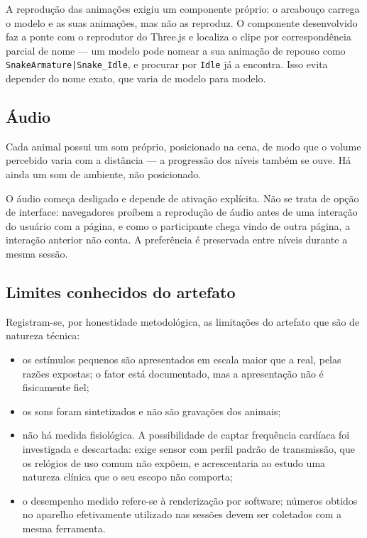 A reprodução das animações exigiu um componente próprio: o arcabouço
carrega o modelo e as suas animações, mas não as reproduz. O componente
desenvolvido faz a ponte com o reprodutor do Three.js e localiza o clipe
por correspondência parcial de nome --- um modelo pode nomear a sua
animação de repouso como \texttt{SnakeArmature|Snake\_Idle}, e procurar
por \texttt{Idle} já a encontra. Isso evita depender do nome exato, que
varia de modelo para modelo.

\subsection{Áudio}

Cada animal possui um som próprio, posicionado na cena, de modo que o
volume percebido varia com a distância --- a progressão dos níveis também
se ouve. Há ainda um som de ambiente, não posicionado.

O áudio começa desligado e depende de ativação explícita. Não se trata de
opção de interface: navegadores proíbem a reprodução de áudio antes de
uma interação do usuário com a página, e como o participante chega vindo
de outra página, a interação anterior não conta. A preferência é
preservada entre níveis durante a mesma sessão.

\subsection{Limites conhecidos do artefato}

Registram-se, por honestidade metodológica, as limitações do artefato que
são de natureza técnica:

\begin{itemize}
  \item os estímulos pequenos são apresentados em escala maior que a
  real, pelas razões expostas; o fator está documentado, mas a
  apresentação não é fisicamente fiel;

  \item os sons foram sintetizados e não são gravações dos animais;

  \item não há medida fisiológica. A possibilidade de captar frequência
  cardíaca foi investigada e descartada: exige sensor com perfil padrão
  de transmissão, que os relógios de uso comum não expõem, e
  acrescentaria ao estudo uma natureza clínica que o seu escopo não
  comporta;

  \item o desempenho medido refere-se à renderização por software;
  números obtidos no aparelho efetivamente utilizado nas sessões devem
  ser coletados com a mesma ferramenta.
\end{itemize}
